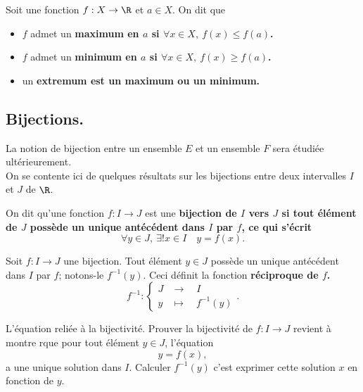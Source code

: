 \documentclass[11pt]{article}
\begin{document}
\begin{defi}{}{}
    Soit une fonction $f:X\to\R$ et $a\in X$. On dit que
    \begin{itemize}
        \item $f$ admet un \bf{maximum} en $a$ si $\forall x\in X,~f(x)\leq f(a)$.
        \item $f$ admet un \bf{minimum} en $a$ si $\forall x\in X,~f(x)\geq f(a)$.
        \item un \bf{extremum} est un maximum ou un minimum.
    \end{itemize}
\end{defi}

\subsection{Bijections.}

La notion de bijection entre un ensemble $E$ et un ensemble $F$ sera étudiée ultérieurement.\\
On se contente ici de quelques résultats sur les bijections entre deux intervalles $I$ et $J$ de $\R$.

\begin{defi}{}{}
    On dit qu'une fonction $f:I\to J$ est une \bf{bijection} de $I$ vers $J$ si tout élément de $J$ possède un unique antécédent dans $I$ par $f$, ce qui s'écrit
    \begin{equation*}
        \forall y \in J,~\exists!x\in I\quad y=f(x).
    \end{equation*}
\end{defi}

\begin{defi}{}{}
    Soit $f:I\to J$ une bijection. Tout élément $y\in J$ possède un unique antécédent dans $I$ par $f$; notons-le $f^{-1}(y)$. Ceci définit la fonction \bf{réciproque} de $f$.
    \begin{equation*}
        f^{-1}:\begin{cases}J&\to\quad I\\y&\mapsto\quad f^{-1}(y)\end{cases}.
    \end{equation*}
\end{defi}

\begin{meth}{L'équation reliée à la bijectivité.}{}
    Prouver la bijectivité de $f:I\to J$ revient à montre rque pour tout élément $y\in J$, l'équation
    \begin{equation*}
        y=f(x),
    \end{equation*}
    a une unique solution dans $I$. Calculer $f^{-1}(y)$ c'est exprimer cette solution $x$ en fonction de $y$.
\end{meth}
\end{document}
